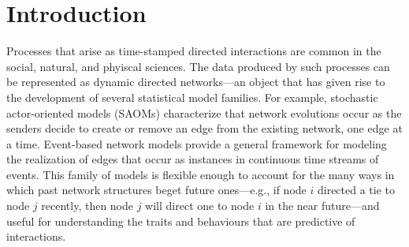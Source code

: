 \documentclass[ba]{imsart}
\numberwithin{equation}{section}
\theoremstyle{plain}
\begin{document}
\begin{frontmatter}
		\begin{keyword}[class=MSC]
		\end{keyword}
		
		\begin{keyword}
		\end{keyword}
		
	\end{frontmatter}
	
	\section{Introduction}\label{sec:introduction}
	
	Processes that arise as time-stamped directed interactions are common in the social, natural, and phyiscal sciences. The data produced by such processes can be represented as dynamic directed networks---an object that has given rise to the development of several statistical model families. For example, stochastic actor-oriented models (SAOMs) \citep{snijders1996stochastic,snijders2007modeling} characterize that network evolutions occur as the senders decide to create or remove an edge from the existing network, one edge at a time. Event-based network models \citep{Butts2008,Vu2011,hunter2011dynamic,PerryWolfe2012} provide a general framework for modeling the realization of edges that occur as instances in continuous time streams of events. This family of models is flexible enough to account for the many ways in which past network structures beget future ones---e.g., if node $i$ directed a tie to node $j$ recently, then node $j$ will direct one to node $i$ in the near future---and useful for understanding the traits and behaviours that are predictive of interactions. 
	
\end{document}
